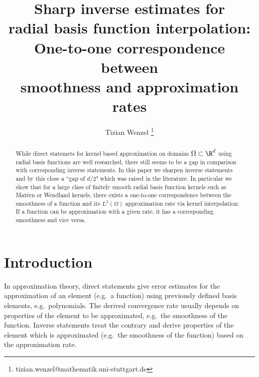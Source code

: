 \documentclass[a4paper, 10pt]{article}
\title{Sharp inverse estimates for \\ radial basis function interpolation: \\ One-to-one correspondence between \\ smoothness and approximation rates}
\author[1]{Tizian Wenzel \thanks{tizian.wenzel@mathematik.uni-stuttgart.de}}
\affil[1]{Institute for Applied Analysis and Numerical Simulation, University of Stuttgart, Germany}
\begin{document}
\maketitle %



  
\begin{abstract}
While direct statemets for kernel based approximation on domains $\Omega \subset \R^d$ using radial basis functions are well researched, 
there still seems to be a gap in comparison with corresponding inverse statements.
In this paper we sharpen inverse statements and by this close a ``gap of $d/2$" which was raised in the literature.
In particular we show that for a large class of finitely smooth radial basis function kernels such as Matérn or Wendland kernels, 
there exists a one-to-one correspondence between the smoothness of a function and its $L^2(\Omega)$ approximation rate via kernel interpolation: 
If a function can be approximation with a given rate, it has a corresponding smoothness and vice versa.
%
\end{abstract}

%
%
%
%
%
%
%
%
 

%
%
%
%
%
%
%
%

%
 
%
%
%
%
%
%
%
%
%
%
%
%
%
%
%
%
%
%
%
%
%
%
%
%
%
%
%
%
%
%
%
%
%
%
%
%
%
%
%
%
%
%


\section{Introduction} \label{sec:introduction}

In approximation theory, direct statements give error estimates for the approximation of an element (e.g.\ a function) %
using previously defined basis elements, e.g.\ polynomials.
The derived convergence rate usually depends on properties of the element to be approximated, e.g.\ the smoothness of the function.
Inverse statements treat the contrary and derive properties of the element which is approximated (e.g.\ the smoothness of the function) based on the approximation rate.
\end{document}
